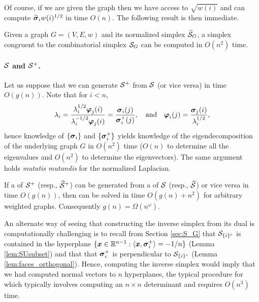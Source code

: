 Of course, if we are given the graph then we have access to $\sqrt{w(i)}$ and can compute $\widehat{\vb*{\sigma}}_i w(i)^{1/2}$ in time $O(n)$. The following result is then immediate. 

\begin{lemma}
	Given a graph $G=(V,E,w)$ and its normalized simplex $\widehat{\mathcal{S}}_G$, a simplex congruent to  the combinatorial simplex $\mathcal{S}_G$ can be computed in $O(n^2)$ time. 
\end{lemma}




\paragraph{\texorpdfstring{$\mathcal{S}$}{The combinatorial} and \texorpdfstring{$\mathcal{S}^+$}{normalized simplex}.}

Let us suppose that we can generate $\mathcal{S}^+$ from $\mathcal{S}$ (or vice versa) in time $O(g(n))$. Note that for $i<n$, 
\[\lambda_i = \frac{\lambda_i^{1/2} \vb*{\varphi}_j(i)}{\lambda_i^{-1/2}\vb*{\varphi}_j(i)} = \frac{\vb*{\sigma}_i(j)}{\vb*{\sigma}_i^+(j)}, \quad \text{and} \quad \vb*{\varphi}_i(j) = \frac{\vb*{\sigma}_j(i)}{\lambda_i^{1/2}},\]
hence knowledge of $\{\vb*{\sigma}_i\}$ and $\{\vb*{\sigma}_i^+\}$ yields knowledge of the eigendecomposition of the underlying graph $G$ in $O(n^2)$ time ($O(n)$ to determine all the  eigenvalues and $O(n^2)$ to determine the eigenvectors). The same argument holds \emph{mutatis mutandis} for the normalized Laplacian. 

\begin{lemma}
	\label{lem:S_to_S^+_vdesc}
	If a \vdesc of $\mathcal{S}^+$  (resp., $\widehat{\mathcal{S}}^+$) can be generated from a \vdesc of $\mathcal{S}$ (resp., $\widehat{\mathcal{S}}$) or vice versa in time $O(g(n))$, then \lapdecomp can be solved in time $O(g(n) + n^2)$ for arbitrary weighted graphs. Consequently $g(n) = \Omega(n^\omega)$.  
\end{lemma}

An alternate way of seeing that constructing the inverse simplex from its dual is computationally challenging is to recall from Section \ref{sec:S_G} that $\mathcal{S}_{\{i\}^c}$ is contained in the hyperplane $\{\vb*{x}\in\mathbb{R}^{n-1}:\langle \vb*{x},\vb*{\sigma}_i^+\rangle = -1/n\}$ (Lemma \ref{lem:SUsubset})
 and that that $\vb*{\sigma}_i^+$ is perpendicular to $\mathcal{S}_{\{i\}^c}$ (Lemma \ref{lem:faces_orthogonal}). Hence, computing the inverse simplex would imply that we had computed normal vectors to $n$ hyperplanes, the typical procedure for which typically involves computing an $n\times n$ determinant and requires  $O(n^3)$ time. 
 
